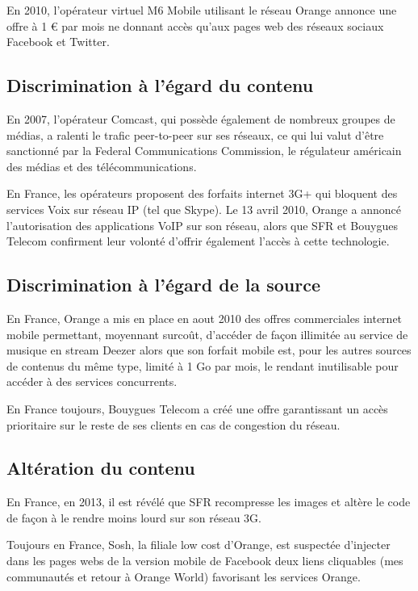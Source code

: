 \documentclass[a4paper,11pt,sf]{leaflet}
\begin{document}
En 2010, l'opérateur virtuel M6 Mobile utilisant le réseau Orange
annonce une offre à 1 \euro{} par mois ne donnant accès qu'aux pages web
des réseaux sociaux Facebook et Twitter.

\subsection{Discrimination à l'égard du
contenu}\label{discrimination-uxe0-luxe9gard-du-contenu}

En 2007, l'opérateur Comcast, qui possède également de nombreux groupes
de médias, a ralenti le trafic peer-to-peer sur ses réseaux, ce qui lui
valut d'être sanctionné par la Federal Communications Commission, le
régulateur américain des médias et des télécommunications.

En France, les opérateurs proposent des forfaits internet 3G+ qui
bloquent des services Voix sur réseau IP (tel que Skype). Le 13 avril
2010, Orange a annoncé l'autorisation des applications VoIP sur son
réseau, alors que SFR et Bouygues Telecom confirment leur volonté
d'offrir également l'accès à cette technologie.

\subsection{Discrimination à l'égard de la
source}\label{discrimination-uxe0-luxe9gard-de-la-source}

En France, Orange a mis en place en aout 2010 des offres commerciales
internet mobile permettant, moyennant surcoût, d'accéder de façon
illimitée au service de musique en stream Deezer alors que son forfait
mobile est, pour les autres sources de contenus du même type, limité à 1
Go par mois, le rendant inutilisable pour accéder à des services
concurrents.

En France toujours, Bouygues Telecom a créé une offre garantissant un
accès \og{}prioritaire\fg{} sur le reste de ses clients en cas de congestion
du réseau.

\subsection{Altération du contenu}\label{altuxe9ration-du-contenu}

En France, en 2013, il est révélé que SFR recompresse les images et
altère le code de façon à le rendre moins lourd sur son réseau 3G.

Toujours en France, Sosh, la filiale \og{}low cost\fg{} d'Orange, est
suspectée d'injecter dans les pages webs de la version mobile de
Facebook deux liens cliquables (\og{}mes communautés\fg{} et \og{}retour à Orange
World\fg{}) favorisant les services Orange.
\end{document}
